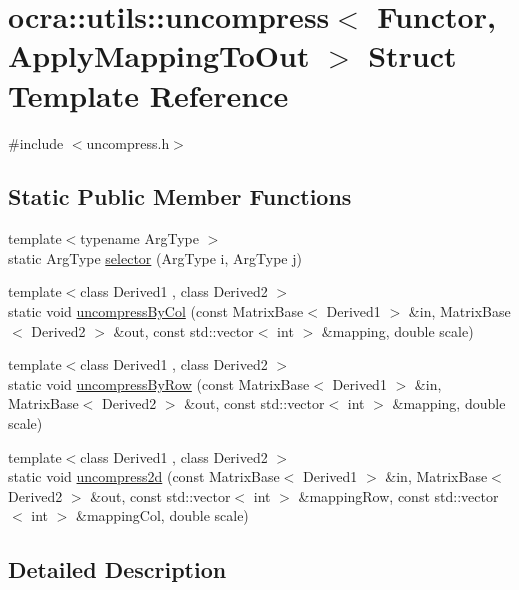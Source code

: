 \hypertarget{structocra_1_1utils_1_1uncompress}{}\section{ocra\+:\+:utils\+:\+:uncompress$<$ Functor, Apply\+Mapping\+To\+Out $>$ Struct Template Reference}
\label{structocra_1_1utils_1_1uncompress}


{\ttfamily \#include $<$uncompress.\+h$>$}

\subsection*{Static Public Member Functions}
\begin{DoxyCompactItemize}
\item 
{\footnotesize template$<$typename Arg\+Type $>$ }\\static Arg\+Type \hyperlink{structocra_1_1utils_1_1uncompress_ad248d8421851c3ec4f9a47263b8b3185}{selector} (Arg\+Type i, Arg\+Type j)
\item 
{\footnotesize template$<$class Derived1 , class Derived2 $>$ }\\static void \hyperlink{structocra_1_1utils_1_1uncompress_af01bd3d80ed6b71b4733602efacf568f}{uncompress\+By\+Col} (const Matrix\+Base$<$ Derived1 $>$ \&in, Matrix\+Base$<$ Derived2 $>$ \&out, const std\+::vector$<$ int $>$ \&mapping, double scale)
\item 
{\footnotesize template$<$class Derived1 , class Derived2 $>$ }\\static void \hyperlink{structocra_1_1utils_1_1uncompress_a5f188f2a0d0abeea1f219c4848b7b84b}{uncompress\+By\+Row} (const Matrix\+Base$<$ Derived1 $>$ \&in, Matrix\+Base$<$ Derived2 $>$ \&out, const std\+::vector$<$ int $>$ \&mapping, double scale)
\item 
{\footnotesize template$<$class Derived1 , class Derived2 $>$ }\\static void \hyperlink{structocra_1_1utils_1_1uncompress_a2c95e21b384c1b0a4c471c45a03fc1a2}{uncompress2d} (const Matrix\+Base$<$ Derived1 $>$ \&in, Matrix\+Base$<$ Derived2 $>$ \&out, const std\+::vector$<$ int $>$ \&mapping\+Row, const std\+::vector$<$ int $>$ \&mapping\+Col, double scale)
\end{DoxyCompactItemize}


\subsection{Detailed Description}

